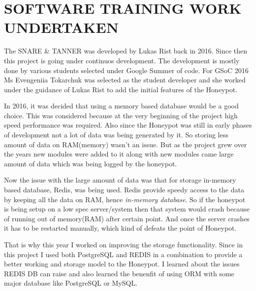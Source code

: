 \newpage
\thispagestyle{empty}
\chapter{SOFTWARE TRAINING WORK UNDERTAKEN} \label{swtraining}
The SNARE & TANNER was developed by Lukas Rist back in 2016. Since then this project is going under continuos development. The development is mostly done by various students selected under Google Summer of code. For GSoC 2016 Ms Evengeniia Tokarchuk was selected as the student developer and she worked under the guidance of Lukas Rist to add the initial features of the Honeypot.

In 2016, it was decided that using a memory based database would be a good choice. This was considered because at the very beginning of the project high speed performance was required. Also since the Honeypot was still in early phases of development not a lot of data was being generated by it. So storing less amount of data on RAM(memory) wasn't an issue. But as the project grew over the years new modules were added to it along with new modules came large amount of data which was being logged by the honeypot.

Now the issue with the large amount of data was that for storage in-memory based database, Redis, was being used. Redis provide speedy access to the data by keeping all the data on RAM, hence \textit{in-memory database}. So if the honeypot is being setup on a low spec server/system then that system would crash because of running out of memory(RAM) after certain point. And once the server crashes it has to be restarted manually, which kind of defeats the point of Honeypot.

That is why this year I worked on improving the storage functionality. Since in this project I used both PostgreSQL and REDIS in a combination to provide a better working and storage model to the Honeypot. I learned about the issues REDIS DB can raise and also learned the benenfit of using ORM with some major database like PostgreSQL or MySQL.
\vfill